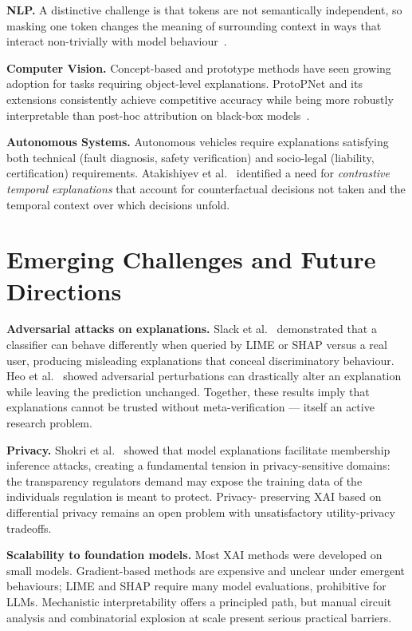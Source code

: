 \documentclass[12pt]{article}
\begin{document}
\textbf{NLP.} A distinctive challenge is that tokens are not semantically
independent, so masking one token changes the meaning of surrounding context in
ways that interact non-trivially with model behaviour~\cite{danilevsky2020survey}.

\textbf{Computer Vision.} Concept-based and prototype methods have seen growing
adoption for tasks requiring object-level explanations. ProtoPNet and its
extensions consistently achieve competitive accuracy while being more robustly
interpretable than post-hoc attribution on black-box models~\cite{chen2019protopnet}.

\textbf{Autonomous Systems.} Autonomous vehicles require explanations satisfying
both technical (fault diagnosis, safety verification) and socio-legal (liability,
certification) requirements. Atakishiyev et al.~\cite{atakishiyev2021explainability}
identified a need for \emph{contrastive temporal explanations} that account for
counterfactual decisions not taken and the temporal context over which decisions
unfold.

\section{Emerging Challenges and Future Directions}
\label{sec:challenges}

\textbf{Adversarial attacks on explanations.} Slack et al.~\cite{slack2020fooling}
demonstrated that a classifier can behave differently when queried by LIME or SHAP
versus a real user, producing misleading explanations that conceal discriminatory
behaviour. Heo et al.~\cite{heo2019fooling} showed adversarial perturbations can
drastically alter an explanation while leaving the prediction unchanged. Together,
these results imply that explanations cannot be trusted without meta-verification
--- itself an active research problem.

\textbf{Privacy.} Shokri et al.~\cite{shokri2021privacy} showed that model
explanations facilitate membership inference attacks, creating a fundamental
tension in privacy-sensitive domains: the transparency regulators demand may expose
the training data of the individuals regulation is meant to protect. Privacy-
preserving XAI based on differential privacy remains an open problem with
unsatisfactory utility-privacy tradeoffs.

\textbf{Scalability to foundation models.} Most XAI methods were developed on
small models. Gradient-based methods are expensive and unclear under emergent
behaviours; LIME and SHAP require many model evaluations, prohibitive for LLMs.
Mechanistic interpretability offers a principled path, but manual circuit analysis
and combinatorial explosion at scale present serious practical barriers.
\end{document}
